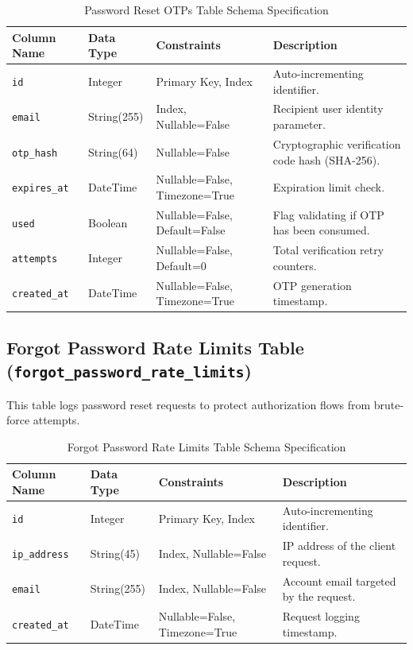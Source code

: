 \begin{table}[h!]
\centering
\small
\renewcommand{\arraystretch}{1.4}
\begin{tabularx}{\textwidth}{l l l X}
    \toprule[1.5pt]
    \rowcolor{primary!5}
    \textbf{\color{primary}Column Name} & \textbf{\color{primary}Data Type} & \textbf{\color{primary}Constraints} & \textbf{\color{primary}Description} \\
    \midrule
    \texttt{id} & Integer & Primary Key, Index & Auto-incrementing identifier. \\
    \texttt{email} & String(255) & Index, Nullable=False & Recipient user identity parameter. \\
    \texttt{otp\_hash} & String(64) & Nullable=False & Cryptographic verification code hash (SHA-256). \\
    \texttt{expires\_at} & DateTime & Nullable=False, Timezone=True & Expiration limit check. \\
    \texttt{used} & Boolean & Nullable=False, Default=False & Flag validating if OTP has been consumed. \\
    \texttt{attempts} & Integer & Nullable=False, Default=0 & Total verification retry counters. \\
    \texttt{created\_at} & DateTime & Nullable=False, Timezone=True & OTP generation timestamp. \\
    \bottomrule[1.5pt]
\end{tabularx}
\caption{Password Reset OTPs Table Schema Specification}
\label{tab:password_reset_otps_table}
\end{table}

\subsection{Forgot Password Rate Limits Table (\texttt{forgot\_password\_rate\_limits})}
This table logs password reset requests to protect authorization flows from brute-force attempts.

\begin{table}[h!]
\centering
\small
\renewcommand{\arraystretch}{1.4}
\begin{tabularx}{\textwidth}{l l l X}
    \toprule[1.5pt]
    \rowcolor{primary!5}
    \textbf{\color{primary}Column Name} & \textbf{\color{primary}Data Type} & \textbf{\color{primary}Constraints} & \textbf{\color{primary}Description} \\
    \midrule
    \texttt{id} & Integer & Primary Key, Index & Auto-incrementing identifier. \\
    \texttt{ip\_address} & String(45) & Index, Nullable=False & IP address of the client request. \\
    \texttt{email} & String(255) & Index, Nullable=False & Account email targeted by the request. \\
    \texttt{created\_at} & DateTime & Nullable=False, Timezone=True & Request logging timestamp. \\
    \bottomrule[1.5pt]
\end{tabularx}
\caption{Forgot Password Rate Limits Table Schema Specification}
\label{tab:forgot_password_rate_limits_table}
\end{table}

